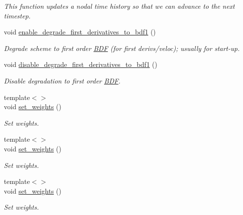 \begin{DoxyCompactItemize}
\begin{DoxyCompactList}\small\item\em This function updates a nodal time history so that we can advance to the next timestep. \end{DoxyCompactList}\item 
void \hyperlink{classoomph_1_1NewmarkBDF_ae86538697fa6188d8fd14fe87312e078}{enable\+\_\+degrade\+\_\+first\+\_\+derivatives\+\_\+to\+\_\+bdf1} ()
\begin{DoxyCompactList}\small\item\em Degrade scheme to first order \hyperlink{classoomph_1_1BDF}{B\+DF} (for first derivs/veloc); usually for start-\/up. \end{DoxyCompactList}\item 
void \hyperlink{classoomph_1_1NewmarkBDF_a377f4f3fd695a29024eb27d6748c689b}{disable\+\_\+degrade\+\_\+first\+\_\+derivatives\+\_\+to\+\_\+bdf1} ()
\begin{DoxyCompactList}\small\item\em Disable degradation to first order \hyperlink{classoomph_1_1BDF}{B\+DF}. \end{DoxyCompactList}\item 
{\footnotesize template$<$$>$ }\\void \hyperlink{classoomph_1_1NewmarkBDF_a4ac70586d355c8f45ec8dd4f94c3316a}{set\+\_\+weights} ()
\begin{DoxyCompactList}\small\item\em Set weights. \end{DoxyCompactList}\item 
{\footnotesize template$<$$>$ }\\void \hyperlink{classoomph_1_1NewmarkBDF_af474fb6329584b3055d757a743919fda}{set\+\_\+weights} ()
\begin{DoxyCompactList}\small\item\em Set weights. \end{DoxyCompactList}\item 
{\footnotesize template$<$$>$ }\\void \hyperlink{classoomph_1_1NewmarkBDF_a1fe8947081bc206ccf050fa643010036}{set\+\_\+weights} ()
\begin{DoxyCompactList}\small\item\em Set weights. \end{DoxyCompactList}\end{DoxyCompactItemize}
